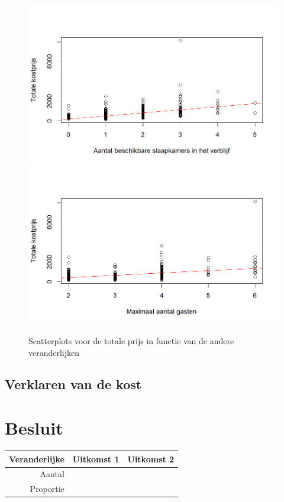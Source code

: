 \documentclass[a4paper]{kulakarticle}
\begin{document}
\begin{figure}
	\includegraphics[width=0.49\linewidth]{Figuren/bedrooms}
	\includegraphics[width=0.49\linewidth]{Figuren/capacity}
	\caption{Scatterplots voor de totale prijs in functie van de andere veranderlijken}
	\label{fig:scatter}
\end{figure}
	\subsection{Verklaren van de kost}
	
	
	\section*{Besluit}
	\begin{table}[h]
		\begin{tabular}{r*{2}{|r}}
			Veranderlijke & Uitkomst 1 & Uitkomst 2 \\ \hline
			Aantal &            &            \\ \hline
			Proportie &            &
		\end{tabular}
	\end{table}
\end{document}
